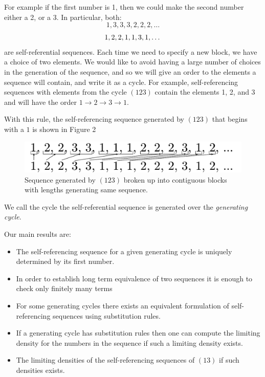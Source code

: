 \documentclass[runningheads,a4paper]{llncs}
\begin{document}
For example if the first number is 1, then we could make the second number either a 2, or a 3. In particular, both:
\begin{equation}
1, 3, 3, 3, 2, 2, 2, \dots
\end{equation}
\begin{equation}
1, 2, 2, 1, 1, 3, 1, \dots\\
\end{equation}
are self-referential sequences.
Each time we need to specify a new block, we have a choice of two elements. We would like to avoid having a large number of choices in the generation of the sequence, and so we will give an order to the elements a sequence will contain, and write it as a cycle. 
For example, self-referencing sequences with elements from the cycle $(123 )$ contain the elements 1, 2, and 3 and will have the order $1 \rightarrow 2 \rightarrow 3 \rightarrow 1$. 

With this rule, the self-referencing sequence generated by $(123)$ that begins with a $1$ is shown in Figure 2 %
\begin{figure}
\label{fig:onetwothree}
\center
\includegraphics[width=0.4\linewidth]{sequenceBlocks123}
\caption{Sequence generated by $(123)$ broken up into contiguous blocks with lengths generating same sequence.}
\end{figure}

We call the cycle the self-referential sequence is generated over the \emph{generating cycle}.

Our main results are:
\begin{itemize}
\item The self-referencing sequence for a given generating cycle is uniquely determined by its first number.
\item In order to establish long term equivalence of two sequences it is enough to check only finitely many terms 
\item For some generating cycles there exists an equivalent formulation of self-referencing sequences using substitution rules.
\item If a generating cycle has substitution rules then one can compute the limiting density for the numbers in the sequence if such a limiting density exists.
\item The limiting densities of the self-referencing sequences of $(13)$ if such densities exists.
\end{itemize}
\end{document}
